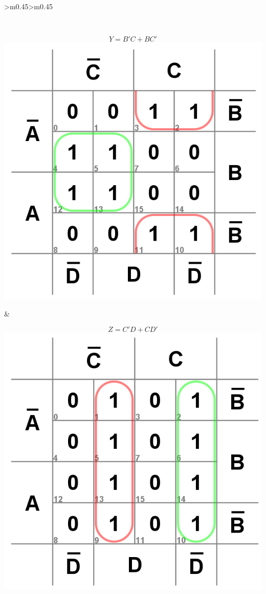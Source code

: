 \documentclass{article}
\begin{document}
\begin{center}
\begin{tabular}{>{\centering\arraybackslash}m{0.45\textwidth}>{\centering\arraybackslash}m{0.45\textwidth}}
\begin{minipage}[t]{\linewidth}
\end{minipage}
\\
\begin{minipage}[t]{\linewidth}
    \centering
    $$Y = B'C + BC'$$
    \includegraphics[width=0.8\linewidth]{bcd2gray-Y.png}
\end{minipage}
&
\begin{minipage}[t]{\linewidth}
    \centering
    $$Z = C'D + CD'$$
    \includegraphics[width=0.8\linewidth]{bcd2gray-Z.png}
\end{minipage}
\\
\end{tabular}
\end{center}
\end{document}
